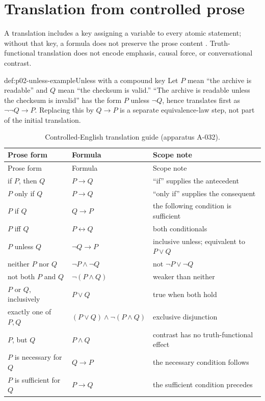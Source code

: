 \section{Translation from controlled prose}
\label{sec:p02-controlled-prose}

A translation includes a key assigning a variable to every atomic statement;
without that key, a formula does not preserve the prose content
\cite{OpenLogic2026}.  Truth-functional translation does not encode emphasis,
causal force, or conversational contrast.

\begin{hbexample}{def:p02-unless-example}{Unless with a compound key}
Let \(P\) mean ``the archive is readable'' and \(Q\) mean ``the checksum is
valid.''  ``The archive is readable unless the checksum is invalid'' has the
form \(P\) unless \(\neg Q\), hence translates first as
\(\neg\neg Q\to P\).  Replacing this by \(Q\to P\) is a separate
equivalence-law step, not part of the initial translation.
\end{hbexample}

\begingroup\small
\begin{longtable}{@{}p{}p{}p{}@{}}
\caption{Controlled-English translation guide (apparatus A-032).}
\label{tab:p02-controlled-english}\\
\toprule Prose form & Formula & Scope note \\
\midrule\endfirsthead
\toprule Prose form & Formula & Scope note \\
\midrule\endhead
if \(P\), then \(Q\) & \(P\to Q\) & ``if'' supplies the antecedent \\
\(P\) only if \(Q\) & \(P\to Q\) & ``only if'' supplies the consequent \\
\(P\) if \(Q\) & \(Q\to P\) & the following condition is sufficient \\
\(P\) iff \(Q\) & \(P\leftrightarrow Q\) & both conditionals \\
\(P\) unless \(Q\) & \(\neg Q\to P\) & inclusive unless; equivalent to \(P\lor Q\) \\
neither \(P\) nor \(Q\) & \(\neg P\land\neg Q\) & not \(\neg P\lor\neg Q\) \\
not both \(P\) and \(Q\) & \(\neg(P\land Q)\) & weaker than neither \\
\(P\) or \(Q\), inclusively & \(P\lor Q\) & true when both hold \\
exactly one of \(P,Q\) & \((P\lor Q)\land\neg(P\land Q)\) & exclusive disjunction \\
\(P\), but \(Q\) & \(P\land Q\) & contrast has no truth-functional effect \\
\(P\) is necessary for \(Q\) & \(Q\to P\) & the necessary condition follows \\
\(P\) is sufficient for \(Q\) & \(P\to Q\) & the sufficient condition precedes \\
\bottomrule
\end{longtable}
\endgroup

